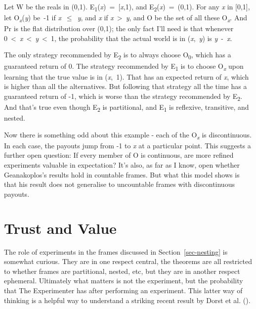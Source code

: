 \documentclass[
  12pt,
  letterpaper,
  DIV=11,
  numbers=noendperiod]{scrartcl}
\begin{document}
Let W be the reals in (0,1).
E\textsubscript{1}(\emph{x})~=~{[}\emph{x},1), and
E\textsubscript{2}(\emph{x})~=~(0,1). For any \emph{x} in {[}0,1{]}, let
O\textsubscript{\emph{x}}(\emph{y}) be~-1 if \emph{x}~$\leq$~\emph{y}, and
\emph{x} if \emph{x}~\textgreater~\emph{y}, and O be the set of all
these O\textsubscript{\emph{x}}. And Pr is the flat distribution over
(0,1); the only fact I'll need is that whenever
0~\textless~\emph{x}~\textless~\emph{y}~\textless~1, the probability
that the actual world is in (\emph{x},~\emph{y}) is \emph{y}~-~\emph{x}.

The only strategy recommended by E\textsubscript{2} is to always choose
O\textsubscript{0}, which has a guaranteed return of 0. The strategy
recommended by E\textsubscript{1} is to choose O\textsubscript{\emph{x}}
upon learning that the true value is in (\emph{x},~1). That has an
expected return of \emph{x}, which is higher than all the alternatives.
But following that strategy all the time has a guaranteed return of -1,
which is worse than the strategy recommended by E\textsubscript{2}. And
that's true even though E\textsubscript{2} is partitional, and
E\textsubscript{1} is reflexive, transitive, and nested.

Now there is something odd about this example - each of the
O\textsubscript{\emph{x}} is discontinuous. In each case, the payouts
jump from -1 to \emph{x} at a particular point. This suggests a further
open question: If every member of O is continuous, are more refined
experiments valuable in expectation? It's also, as far as I know, open
whether Geanakoplos's results hold in countable frames. But what this
model shows is that his result does not generalise to uncountable frames
with discontinuous payouts.

\section{Trust and Value}\label{sec-dorst}

The role of experiments in the frames discussed in
Section~\ref{sec-nesting} is somewhat curious. They are in one respect
central, the theorems are all restricted to whether frames are
partitional, nested, etc, but they are in another respect ephemeral.
Ultimately what matters is not the experiment, but the probability that
The Experimenter has after performing an experiment. This latter way of
thinking is a helpful way to understand a striking recent result by
Dorst et al. ().
\end{document}
